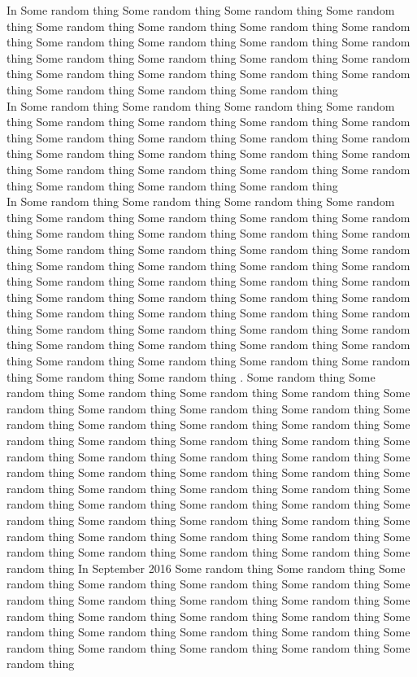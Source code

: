 In \cite{linthicum2017connecting} Some random thing Some random thing Some random thing Some random thing Some random thing Some random thing Some random thing Some random thing Some random thing Some random thing Some random thing Some random thing Some random thing Some random thing Some random thing Some random thing Some random thing Some random thing Some random thing Some random thing Some random thing Some random thing Some random thing  \\
In \cite{shen2017block} Some random thing Some random thing Some random thing Some random thing Some random thing Some random thing Some random thing Some random thing Some random thing Some random thing Some random thing Some random thing Some random thing Some random thing Some random thing Some random thing Some random thing Some random thing Some random thing Some random thing Some random thing Some random thing Some random thing  \\
In \cite{shirazi2017extended} Some random thing Some random thing Some random thing Some random thing Some random thing Some random thing Some random thing Some random thing Some random thing Some random thing Some random thing Some random thing Some random thing Some random thing Some random thing Some random thing Some random thing Some random thing Some random thing Some random thing Some random thing Some random thing Some random thing  
Some random thing Some random thing Some random thing Some random thing Some random thing Some random thing Some random thing Some random thing Some random thing Some random thing Some random thing Some random thing Some random thing Some random thing Some random thing Some random thing Some random thing Some random thing Some random thing Some random thing Some random thing Some random thing Some random thing   \cite{shirazi2017extended}. Some random thing Some random thing Some random thing Some random thing Some random thing Some random thing Some random thing Some random thing Some random thing Some random thing Some random thing Some random thing Some random thing Some random thing Some random thing Some random thing Some random thing Some random thing Some random thing Some random thing Some random thing Some random thing Some random thing  
Some random thing Some random thing Some random thing Some random thing Some random thing Some random thing Some random thing Some random thing Some random thing Some random thing Some random thing Some random thing Some random thing Some random thing Some random thing Some random thing Some random thing Some random thing Some random thing Some random thing Some random thing Some random thing Some random thing  In September 2016 \cite{kolias2017ddos} Some random thing Some random thing Some random thing Some random thing Some random thing Some random thing Some random thing Some random thing Some random thing Some random thing Some random thing Some random thing Some random thing Some random thing Some random thing Some random thing Some random thing Some random thing Some random thing Some random thing Some random thing Some random thing Some random thing  
